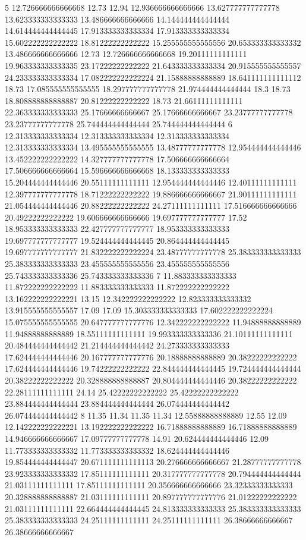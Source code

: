 5 12.726666666666668 12.73 12.94 12.936666666666666 13.627777777777778 13.623333333333333 13.486666666666666 14.144444444444444 14.614444444444445 17.913333333333334 17.913333333333334 15.602222222222222 18.81222222222222 15.255555555555556 20.653333333333332 13.486666666666666 12.73 12.726666666666668 19.20111111111111 19.963333333333335 23.17222222222222 21.643333333333334 20.915555555555557 24.233333333333334 17.082222222222224 21.15888888888889 18.641111111111112 18.73 17.085555555555555 18.297777777777778 21.974444444444444 18.3 18.73 18.808888888888887 20.81222222222222 18.73 21.66111111111111 22.363333333333333 25.17666666666667 25.17666666666667 23.23777777777778 23.23777777777778 25.744444444444444 25.744444444444444
6 12.313333333333334 12.313333333333334 12.313333333333334 12.313333333333334 13.495555555555555 13.48777777777778 12.954444444444446 13.452222222222222 14.327777777777778 17.506666666666664 17.506666666666664 15.596666666666668 18.133333333333333 15.204444444444446 20.55111111111111 12.954444444444446 12.40111111111111 12.397777777777778 18.71222222222222 19.886666666666667 21.90111111111111 21.054444444444446 20.88222222222222 24.27111111111111 17.516666666666666 20.49222222222222 19.606666666666666 19.697777777777777 17.52 18.953333333333333 22.427777777777777 18.953333333333333 19.697777777777777 19.524444444444445 20.864444444444445 19.697777777777777 21.832222222222224 23.48777777777778 25.383333333333333 25.383333333333333 23.455555555555556 23.455555555555556 25.743333333333336 25.743333333333336
7 11.883333333333333 11.872222222222222 11.883333333333333 11.872222222222222 13.162222222222221 13.15 12.342222222222222 12.823333333333332 13.915555555555557 17.09 17.09 15.303333333333333 17.602222222222224 15.075555555555555 20.647777777777776 12.342222222222222 11.94888888888889 11.94888888888889 18.55111111111111 19.993333333333336 21.10111111111111 20.484444444444442 21.214444444444442 24.273333333333333 17.624444444444446 20.167777777777776 20.18888888888889 20.38222222222222 17.624444444444446 19.74222222222222 22.844444444444445 19.724444444444444 20.38222222222222 20.328888888888887 20.804444444444446 20.38222222222222 22.28111111111111 24.14 25.42222222222222 25.42222222222222 23.884444444444444 23.884444444444444 26.074444444444442 26.074444444444442
8 11.35 11.34 11.35 11.34 12.55888888888889 12.55 12.09 12.142222222222221 13.192222222222222 16.71888888888889 16.71888888888889 14.946666666666667 17.09777777777778 14.91 20.624444444444446 12.09 11.773333333333332 11.773333333333332 18.624444444444446 19.854444444444447 20.671111111111113 20.276666666666667 21.28777777777778 23.923333333333332 17.85111111111111 20.317777777777778 20.794444444444444 21.03111111111111 17.85111111111111 20.356666666666666 23.32333333333333 20.328888888888887 21.03111111111111 20.897777777777776 21.01222222222222 21.03111111111111 22.664444444444445 24.813333333333333 25.383333333333333 25.383333333333333 24.25111111111111 24.25111111111111 26.38666666666667 26.38666666666667
